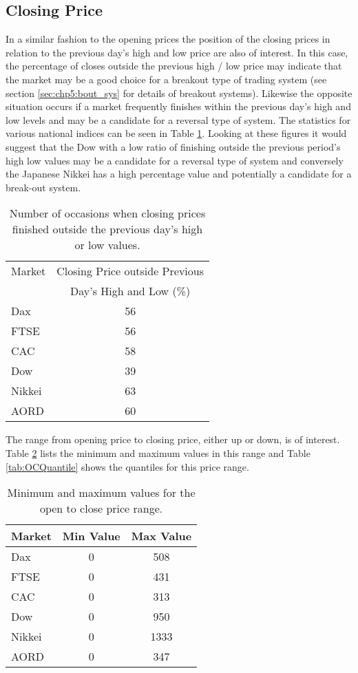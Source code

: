 \subsection{Closing Price}
\label{sec:closing_prices}
In a similar fashion to the opening prices the position of the closing prices in relation to the previous day's high and low price are also of interest. In this case, the percentage of closes outside the previous high / low price may indicate that the market may be a good choice for a breakout type of trading system (see section \ref{sec:chp5:bout_sys} for details of breakout systems). Likewise the opposite situation occurs if a market frequently finishes within the previous day's high and low levels and may be a candidate for a reversal type of system. The statistics for various national indices can be seen in Table \ref{tab:closeHL}. Looking at these figures it would suggest that the Dow with a low ratio of finishing outside the previous period's high low values may be a candidate for a reversal type of system and conversely the Japanese Nikkei has a high percentage value and potentially a candidate for a break-out system.

\begin{table}[!htbp] \centering 
  \caption[Closing Prices in relation to previous day's HL.]{Number of occasions when closing prices finished outside the previous day's high or low values.} 
  \label{tab:closeHL}
\begin{tabular}{lc} 
\toprule 
Market & Closing Price outside Previous   \\ 
       &  Day's High and Low (\%) \\
\midrule 
Dax & 56 \\ 
FTSE & 56  \\ 
CAC & 58 \\ 
Dow & 39  \\ 
Nikkei & 63 \\ 
AORD & 60 \\
\bottomrule 
\end{tabular} 
\end{table} 

The range from opening price to closing price, either up or down, is of interest. Table \ref{tab:OCrange} lists the minimum and maximum values in this range and Table \ref{tab:OCQuantile} shows the quantiles for this price range.

\begin{table}[!h] \centering 
  \caption[Daily Open to Close Price Range.]{Minimum and maximum values for the open to close price range.} 
  \label{tab:OCrange}
\begin{tabular}{lcc} 
\toprule 
Market & Min Value & Max Value  \\ 
\midrule
Dax  & 0 & 508  \\ 
FTSE & 0 & 431  \\ 
CAC  & 0 & 313  \\ 
Dow  & 0 & 950  \\ 
Nikkei & 0 & 1333  \\ 
AORD   & 0 & 347  \\ 
\bottomrule
\end{tabular} 
\end{table} 



